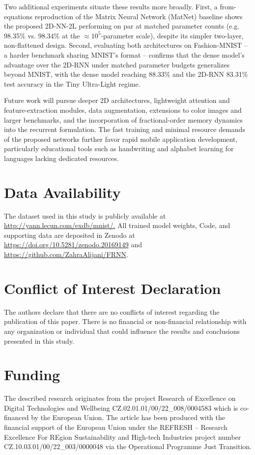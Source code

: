 \documentclass[pdflatex,sn-mathphys-num]{sn-jnl}%
\theoremstyle{thmstyleone}%
\theoremstyle{thmstyletwo}%
\theoremstyle{thmstylethree}%
\begin{document}
Two additional experiments situate these results more broadly. First, a from-equations reproduction of the Matrix Neural Network (MatNet) baseline \cite{Gao2017MatNet} shows the proposed 2D-NN-2L performing on par at matched parameter counts (e.g. 98.35\% vs. 98.34\% at the $\approx10^5$-parameter scale), despite its simpler two-layer, non-flattened design. Second, evaluating both architectures on Fashion-MNIST -- a harder benchmark sharing MNIST's format -- confirms that the dense model's advantage over the 2D-RNN under matched parameter budgets generalizes beyond MNIST, with the dense model reaching 88.33\% and the 2D-RNN 83.31\% test accuracy in the Tiny Ultra-Light regime.

Future work will pursue deeper 2D architectures, lightweight attention and feature-extraction modules, data augmentation, extensions to color images and larger benchmarks, and the incorporation of fractional-order memory dynamics into the recurrent formulation. The fast training and minimal resource demands of the proposed networks further favor rapid mobile application development, particularly educational tools such as handwriting and alphabet learning for languages lacking dedicated resources.





\section*{Data Availability}
The dataset used in this study is publicly available at \url{http://yann.lecun.com/exdb/mnist/.} 
All trained model weights, Code, and supporting data are deposited in Zenodo at \url{https://doi.org/10.5281/zenodo.20169149} and \url{https://github.com/ZahraAlijani/FRNN}.


\section*{Conflict of Interest Declaration}
The authors declare that there are no conflicts of interest regarding the publication of this paper. There is no financial or non-financial relationship with any organization or individual that could influence the results and conclusions presented in this study.


\section*{Funding}

The described research originates from the project Research of Excellence on Digital Technologies and Wellbeing CZ.02.01.01/00/22\_008/0004583 which is co-financed by the European Union.
The article has been produced with the financial support of the European Union under the REFRESH – Research Excellence For REgion Sustainability and High-tech Industries project number CZ.10.03.01/00/22\_003/0000048 via the Operational Programme Just Transition.
\end{document}
